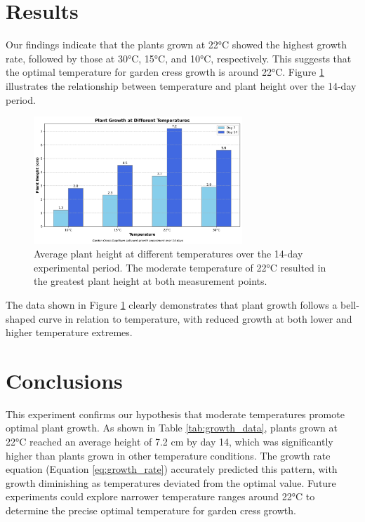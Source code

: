 \documentclass{article}
\begin{document}
\section{Results}
Our findings indicate that the plants grown at 22°C showed the highest growth rate, followed by those at 30°C, 15°C, and 10°C, respectively. This suggests that the optimal temperature for garden cress growth is around 22°C. Figure \ref{fig:growth_chart} illustrates the relationship between temperature and plant height over the 14-day period.

\begin{figure}[H]
\centering
\includegraphics[width=0.7\textwidth]{plant_growth_chart.png}
\caption{Average plant height at different temperatures over the 14-day experimental period. The moderate temperature of 22°C resulted in the greatest plant height at both measurement points.}
\label{fig:growth_chart}
\end{figure}

The data shown in Figure \ref{fig:growth_chart} clearly demonstrates that plant growth follows a bell-shaped curve in relation to temperature, with reduced growth at both lower and higher temperature extremes.

\section{Conclusions}
This experiment confirms our hypothesis that moderate temperatures promote optimal plant growth. As shown in Table \ref{tab:growth_data}, plants grown at 22°C reached an average height of 7.2 cm by day 14, which was significantly higher than plants grown in other temperature conditions. The growth rate equation (Equation \ref{eq:growth_rate}) accurately predicted this pattern, with growth diminishing as temperatures deviated from the optimal value. Future experiments could explore narrower temperature ranges around 22°C to determine the precise optimal temperature for garden cress growth.
\end{document}
